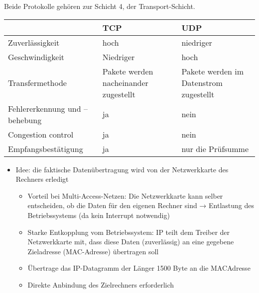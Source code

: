 Beide Protokolle gehören zur Schicht 4, der Transport-Schicht.
\bigbreak
\begin{tabularx}{\textwidth}{|X|X|X|}
    \hline
    & TCP & UDP \tabularnewline
    \hline
    Zuverlässigkeit & hoch & niedriger \tabularnewline
    \hline
    Geschwindigkeit & Niedriger & hoch \tabularnewline
    \hline
    Transfermethode & Pakete werden nacheinander zugestellt & Pakete werden im Datenstrom zugestellt \tabularnewline
    \hline
    Fehlererkennung und – behebung & ja & nein \tabularnewline
    \hline
    Congestion control & ja & nein \tabularnewline
    \hline
    Empfangsbestätigung & ja & nur die Prüfsumme \tabularnewline
    \hline
\end{tabularx}

\begin{itemize}
    \item Idee: die faktische Datenübertragung wird von der Netzwerkkarte des Rechners erledigt
    \begin{itemize}
        \item Vorteil bei Multi-Access-Netzen: Die Netzwerkkarte kann selber entscheiden, ob die Daten für den eigenen Rechner sind
        → Entlastung des Betriebssystems (da kein Interrupt notwendig)
        \item Starke Entkopplung vom Betriebssystem: IP teilt dem Treiber der Netzwerkkarte mit, dass diese Daten (zuverlässig) an eine gegebene Zieladresse (MAC-Adresse) übertragen soll
        \item Übertrage das IP-Datagramm der Länger 1500 Byte an die MACAdresse
        \item Direkte Anbindung des Zielrechners erforderlich
    \end{itemize}
\end{itemize}